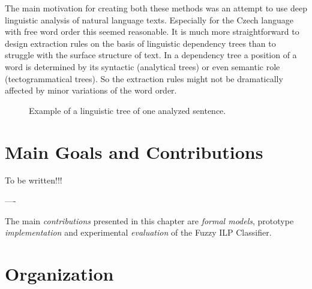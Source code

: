 The main motivation for creating both these methods was an attempt to use deep linguistic analysis of natural language texts. Especially for the Czech language with free word order this seemed reasonable. It is much more straightforward to design extraction rules on the basis of linguistic dependency trees than to struggle with the surface structure of text. In a dependency tree a position of a word is determined by its syntactic (analytical trees) or even semantic role (tectogrammatical trees). So the extraction rules might not be dramatically affected by minor variations of the word order.


\begin{figure}
\centerline{}
\caption{Example of a linguistic tree of one analyzed sentence.}
\label{fig:intro_damage_tree} 
\end{figure}



\section{Main Goals and Contributions}

To be written!!!

----

The main \emph{contributions} presented in this chapter are \emph{formal models}, prototype \emph{implementation} and experimental \emph{evaluation} of the Fuzzy ILP Classifier.



\section{Organization}

